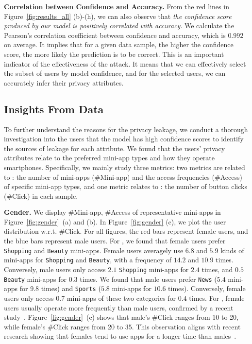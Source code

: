 \noindent \textbf{Correlation between Confidence and Accuracy.}
From the red lines in Figure~\ref{fig:results_all} (b)-(h), we can also observe
that \textit{the confidence score produced by our model is positively correlated
with accuracy}. We calculate the Pearson's correlation coefficient between confidence and accuracy, which is $0.992$ on average. It implies that for a given data sample, the higher the
confidence score, the more likely the prediction is to be correct. This is an
important indicator of the effectiveness of the attack. It means that we can
effectively select the subset of users by model confidence, and for the selected
users, we can accurately infer their privacy attributes. 


\subsection{Insights From Data}
\label{sec:exp_insights}

To further understand the reasons for the privacy leakage, we
conduct a thorough investigation into the users that the model has high
confidence scores to identify the sources of leakage for each
attribute. 
We found that the users' privacy attributes relate to the preferred mini-app types and how they operate smartphones.
% 
Specifically, we mainly study three metrics: two metrics are related to \mini: the number of mini-apps (\#Mini-app) and the access frequencies (\#Access) of specific mini-app types, and one metric relates to \op: the number of button clicks (\#Click) in each \op sample.


\noindent \textbf{Gender.}
We display \#Mini-app, \#Access of representative mini-apps in Figure~\ref{fig:gender}~(a) and (b). In
Figure~\ref{fig:gender} (c), we plot the user distribution w.r.t. \#Click. For all figures, the red bars represent female
users, and the blue bars represent male users.
% 
For \mini, we
found that female users prefer \texttt{Shopping} and
\texttt{Beauty} mini-apps. Female users averagely use $6.8$ and
$5.9$ kinds of mini-apps for \texttt{Shopping} and \texttt{Beauty}, with a frequency
of $14.2$ and $10.9$ times. Conversely, male users only access
$2.1$ \texttt{Shopping} mini-apps for $2.4$ times, and $0.5$ \texttt{Beauty} mini-apps
for $0.3$ times. 
% 
We found that male users prefer \texttt{News} ($5.4$ mini-apps for $9.8$ times) and
\texttt{Sports} ($5.8$ mini-apps for $10.6$ times). Conversely, female users
only access $0.7$ mini-apps of these two categories for $0.4$ times.
% 
For \op, female users usually operate more frequently than male
users, confirmed by a recent study~\cite{tian2021and}.
Figure~\ref{fig:gender}~(c) shows that male's \#Click ranges from 10 to
20, while female's \#Click ranges from 20 to 35. This observation aligns
with recent research showing that females tend to use apps for a longer time than
males~\cite{tian2021and}. 







